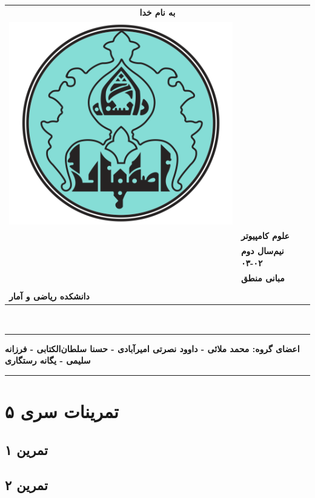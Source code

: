\documentclass[]{exam}
\begin{document}
\pagestyle{head}
\firstpageheader{}{}{}
\runningheadrule
\begin{tabular}{p{} l}
\multicolumn{2}{c}{\textbf{به نام خدا}}\\
\multirow{2}{*}{\includegraphics[scale=0.2] {UILOGO.png}} & \\ \\
&  \textbf{علوم کامپیوتر}\\
&  \textbf{نیم‌سال دوم ۰۲-۰۳}\\
&  \textbf{مبانی منطق}\\ \\
 \textbf{دانشکده ریاضی و آمار} &  \\
\end{tabular}\\

\rule[1ex]{\textwidth}{.1pt}
\textbf{
    اعضای گروه: 
    محمد ملائی - داوود نصرتی امیرآبادی - 
    حسنا سلطان‌الکتابی - فرزانه سلیمی - یگانه رستگاری
}


\rule[1ex]{\textwidth}{.1pt}
\vspace{0pt}

\section*{تمرینات سری ۵}
\subsection*{تمرین ۱}

\paragraph*{\color{blue}{جواب}}


\vspace{0.5cm}
\subsection*{تمرین ۲}

\paragraph*{\color{blue}{جواب}}

\end{document}
